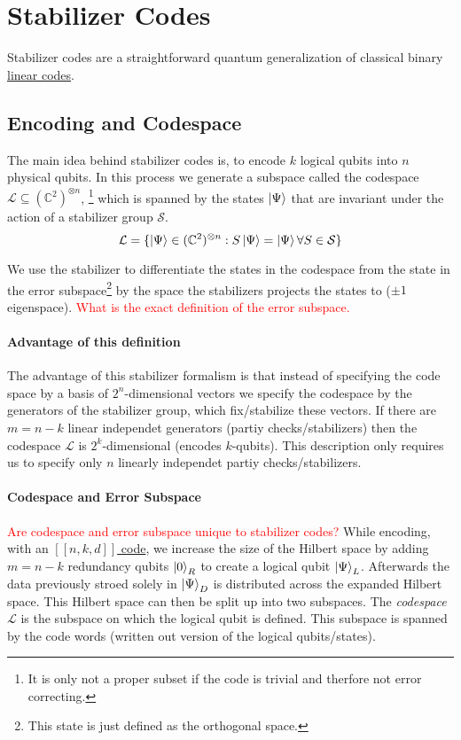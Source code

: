 \section{Stabilizer Codes}
Stabilizer codes are a straightforward quantum generalization of classical binary \hyperref[sec:basic.math.linear_codes]{linear codes}. \cite{QECmemory}


\subsection{Encoding and Codespace}\label{sec:basic.qc.stabilizer}
The main idea behind stabilizer codes is, to encode $k$ logical qubits into $n$ physical qubits.
In this process we generate a subspace called the codespace $\mathcal{L} \subseteq (\mathbb{C}^2)^{\otimes n}$,
\footnote{It is only not a proper subset if the code is trivial and therfore not error correcting.}
which is spanned by the states $\ket{\Psi}$ that are invariant under the action of a stabilizer group $\mathcal{S}$. \cite{QECmemory}
\begin{equation}
    \mathcal{L} = \{ \ket{\Psi} \in (\mathbb{C}^2)^{\otimes n}: S\ket{\Psi}=\ket{\Psi}  \forall S \in \mathcal{S}\}
\end{equation}

We use the stabilizer to differentiate the states in the codespace from the state in the error subspace\footnote{
    This state is just defined as the orthogonal space.
} by the space the stabilizers projects the states to ($\pm1$ eigenspace).
\textcolor{red}{What is the exact definition of the error subspace.}

\paragraph{Advantage of this definition}
The advantage of this stabilizer formalism is that instead of specifying the code space by a basis of $2^n$-dimensional vectors we specify the codespace by the generators of the stabilizer group, which fix/stabilize these vectors. 
If there are $m=n-k$ linear independet generators (partiy checks/stabilizers) then the codespace $\mathcal{L}$ is $2^k$-dimensional (encodes $k$-qubits).
This description only requires us to specify only $n$ linearly independet partiy checks/stabilizers. \cite{QECmemory}

\paragraph{Codespace and Error Subspace}\label{sec:codespace_error_subspace}
\textcolor{red}{Are codespace and error subspace unique to stabilizer codes?}
While encoding, with an \hyperref[sssec:nkd_notation]{$[[n,k,d]]$ code}, we increase the size of the Hilbert space by adding $m=n-k$ redundancy qubits $\ket{0}_R$
to create a logical qubit $\ket{\Psi}_L$. 
Afterwards the data previously stroed solely in $\ket{\Psi}_D$ is distributed across the expanded Hilbert space.
This Hilbert space can then be split up into two subspaces. 
The \textit{codespace} $\mathcal{L}$ is the subspace on which the logical qubit is defined. \cite{QECintro}
This subspace is spanned by the code words (written out version of the logical qubits/states).

